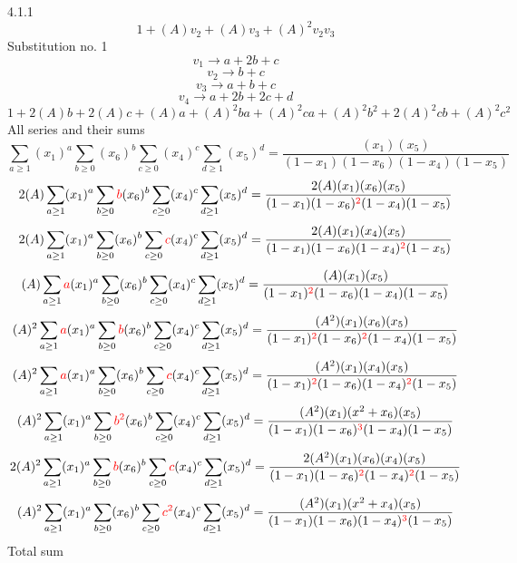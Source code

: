 \documentclass{article}
\begin{document}
                
4.1.1
\[1+(A)v_2+(A)v_3+(A)^2v_2v_3\]Substitution no. 1\[v_1\rightarrow{a+2b+c}\]\[v_2\rightarrow{b+c}\]\[v_3\rightarrow{a+b+c}\]\[v_4\rightarrow{a+2b+2c+d}\]\[1+2(A)b+2(A)c+(A)a+(A)^2ba+(A)^2ca+(A)^2b^{2}+2(A)^2cb+(A)^2c^{2}\]All series and their sums\[\sum_{a\geq{1}}(x_1)^{a}\sum_{b\geq{0}}(x_6)^{b}\sum_{c\geq{0}}(x_4)^{c}\sum_{d\geq{1}}(x_5)^{d}=\frac{(x_1)(x_5)}{(1-x_1)(1-x_6)(1-x_4)(1-x_5)}\]\[2(A)\sum_{a\geq{1}}(x_1)^{a}\sum_{b\geq{0}}\textcolor{red}{b}(x_6)^{b}\sum_{c\geq{0}}(x_4)^{c}\sum_{d\geq{1}}(x_5)^{d}=\frac{2(A)(x_1)(x_6)(x_5)}{(1-x_1)(1-x_6)^{\textcolor{red}{2}}(1-x_4)(1-x_5)}\]\[2(A)\sum_{a\geq{1}}(x_1)^{a}\sum_{b\geq{0}}(x_6)^{b}\sum_{c\geq{0}}\textcolor{red}{c}(x_4)^{c}\sum_{d\geq{1}}(x_5)^{d}=\frac{2(A)(x_1)(x_4)(x_5)}{(1-x_1)(1-x_6)(1-x_4)^{\textcolor{red}{2}}(1-x_5)}\]\[(A)\sum_{a\geq{1}}\textcolor{red}{a}(x_1)^{a}\sum_{b\geq{0}}(x_6)^{b}\sum_{c\geq{0}}(x_4)^{c}\sum_{d\geq{1}}(x_5)^{d}=\frac{(A)(x_1)(x_5)}{(1-x_1)^{\textcolor{red}{2}}(1-x_6)(1-x_4)(1-x_5)}\]\[(A)^{2}\sum_{a\geq{1}}\textcolor{red}{a}(x_1)^{a}\sum_{b\geq{0}}\textcolor{red}{b}(x_6)^{b}\sum_{c\geq{0}}(x_4)^{c}\sum_{d\geq{1}}(x_5)^{d}=\frac{(A^{2})(x_1)(x_6)(x_5)}{(1-x_1)^{\textcolor{red}{2}}(1-x_6)^{\textcolor{red}{2}}(1-x_4)(1-x_5)}\]\[(A)^{2}\sum_{a\geq{1}}\textcolor{red}{a}(x_1)^{a}\sum_{b\geq{0}}(x_6)^{b}\sum_{c\geq{0}}\textcolor{red}{c}(x_4)^{c}\sum_{d\geq{1}}(x_5)^{d}=\frac{(A^{2})(x_1)(x_4)(x_5)}{(1-x_1)^{\textcolor{red}{2}}(1-x_6)(1-x_4)^{\textcolor{red}{2}}(1-x_5)}\]\[(A)^{2}\sum_{a\geq{1}}(x_1)^{a}\sum_{b\geq{0}}\textcolor{red}{b^{2}}(x_6)^{b}\sum_{c\geq{0}}(x_4)^{c}\sum_{d\geq{1}}(x_5)^{d}=\frac{(A^{2})(x_1)(x^{2}+x_6)(x_5)}{(1-x_1)(1-x_6)^{\textcolor{red}{3}}(1-x_4)(1-x_5)}\]\[2(A)^{2}\sum_{a\geq{1}}(x_1)^{a}\sum_{b\geq{0}}\textcolor{red}{b}(x_6)^{b}\sum_{c\geq{0}}\textcolor{red}{c}(x_4)^{c}\sum_{d\geq{1}}(x_5)^{d}=\frac{2(A^{2})(x_1)(x_6)(x_4)(x_5)}{(1-x_1)(1-x_6)^{\textcolor{red}{2}}(1-x_4)^{\textcolor{red}{2}}(1-x_5)}\]\[(A)^{2}\sum_{a\geq{1}}(x_1)^{a}\sum_{b\geq{0}}(x_6)^{b}\sum_{c\geq{0}}\textcolor{red}{c^{2}}(x_4)^{c}\sum_{d\geq{1}}(x_5)^{d}=\frac{(A^{2})(x_1)(x^{2}+x_4)(x_5)}{(1-x_1)(1-x_6)(1-x_4)^{\textcolor{red}{3}}(1-x_5)}\]
Total sum
\end{document}
